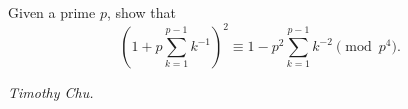 Given a prime $p$, show that \[\left(1+p\sum_{k=1}^{p-1}k^{-1}\right)^2 \equiv 1-p^2\sum_{k=1}^{p-1}k^{-2} \pmod{p^4}.\]

\textit{Timothy Chu.}